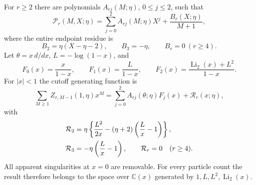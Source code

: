\begin{theorem}
\label{hp:all-r-generator}
For $r\ge2$ there are polynomials $A_{rj}(M;\eta)$,
$0\le j\le2$, such that
\begin{equation}\label{hp:polynomial-plus-residue}
 \mathcal P_r(M,X;\eta)=\sum_{j=0}^2A_{rj}(M;\eta)X^j
                        +\frac{B_r(X;\eta)}{M+1},
\end{equation}
where the entire endpoint residue is
\begin{equation}\label{hp:residue}
 B_2=\eta(X-\eta-2),\qquad B_3=-\eta,\qquad B_r=0\ (r\ge4).
\end{equation}
Let $\theta=x\,d/dx$, $L=-\log(1-x)$, and
\[
 F_0(x)=\frac{x}{1-x},\qquad F_1(x)=\frac{L}{1-x},
 \qquad F_2(x)=\frac{\operatorname{Li}_2(x)+L^2}{1-x}.
\]
For $|x|<1$ the cutoff generating function is
\begin{equation}\label{hp:generator-general}
 \boxed{\displaystyle
 \sum_{M\ge1}Z_{r,M-1}(1,\eta)x^M
       =\sum_{j=0}^2A_{rj}(\theta;\eta)F_j(x)+\mathcal R_r(x;\eta),}
\end{equation}
with
\begin{align}
 \mathcal R_2&=\eta\left\{\frac{L^2}{2x}
                   -(\eta+2)\left(\frac Lx-1\right)\right\},\notag\\
 \mathcal R_3&=-\eta\left(\frac Lx-1\right),\qquad
 \mathcal R_r=0\quad(r\ge4).
 \label{hp:generator-residue}
\end{align}
All apparent singularities at $x=0$ are removable.
For every particle count the result therefore belongs to the
space over $\mathbb C(x)$ generated by
$1,L,L^2,\operatorname{Li}_2(x)$.
\end{theorem}
